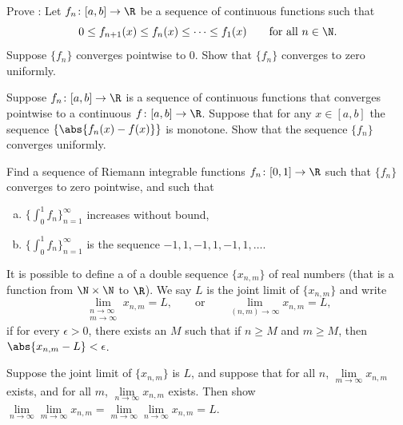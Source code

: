 \documentclass[12pt]{book}
\begin{document}
\begin{exercise}[Hard]
Prove \emph{}:
Let $f_n \colon [a,b] \to \R$ be a sequence of continuous functions such that
\begin{equation*}
0 \leq f_{n+1}(x) \leq f_n(x) \leq \cdots \leq f_1(x) 
\qquad \text{for all $n \in \N$.}
\end{equation*}
Suppose $\{ f_n \}$ converges pointwise to $0$.
Show that $\{ f_n \}$ converges to zero uniformly.
\end{exercise}

\begin{exercise}
Suppose $f_n \colon [a,b] \to \R$ is a sequence of continuous
functions that
converges pointwise
to a continuous $f \colon [a,b] \to \R$.
Suppose that
for any $x \in [a,b]$ the sequence $\{ \abs{f_n(x)-f(x)} \}$ is monotone.
Show that the sequence $\{f_n\}$ converges uniformly.
\end{exercise}

\begin{exercise}
Find a sequence of Riemann integrable functions $f_n \colon [0,1] \to \R$ such
that $\{ f_n \}$ converges to zero pointwise, and such that
\begin{enumerate}[a)]
 \item $\bigl\{ \int_0^1 f_n \bigr\}_{n=1}^\infty$ increases without bound,
  \item $\bigl\{ \int_0^1 f_n \bigr\}_{n=1}^\infty$ is the sequence $-1,1,-1,1,-1,1, \ldots$.
\end{enumerate}
\end{exercise}

\begin{exnote}
It is possible to define a 
\emph{} of a double sequence $\{ x_{n,m} \}$ of real
numbers (that is a function from $\N \times \N$ to $\R$).
We say $L$ is the joint limit of $\{ x_{n,m} \}$ and write
\begin{equation*}
\lim_{\substack{n\to\infty\\m\to\infty}}
x_{n,m} = L ,
\qquad
\text{or}
\qquad
\lim_{(n,m) \to \infty}
x_{n,m} = L ,
\end{equation*}
if for every $\epsilon > 0$, there
exists an $M$ such that if $n \geq M$ and $m \geq M$, then
$\abs{x_{n,m} - L} < \epsilon$.
\end{exnote}

\begin{exercise}
Suppose the joint limit of $\{ x_{n,m} \}$ is $L$, and suppose
that for all $n$, $\lim\limits_{m \to \infty} x_{n,m}$ exists,
and for all $m$, $\lim\limits_{n \to \infty} x_{n,m}$ exists.
Then show
$\lim\limits_{n\to\infty}\lim\limits_{m \to \infty} x_{n,m}
=
\lim\limits_{m\to\infty}\lim\limits_{n \to \infty} x_{n,m} = L$.
\end{exercise}
\end{document}

